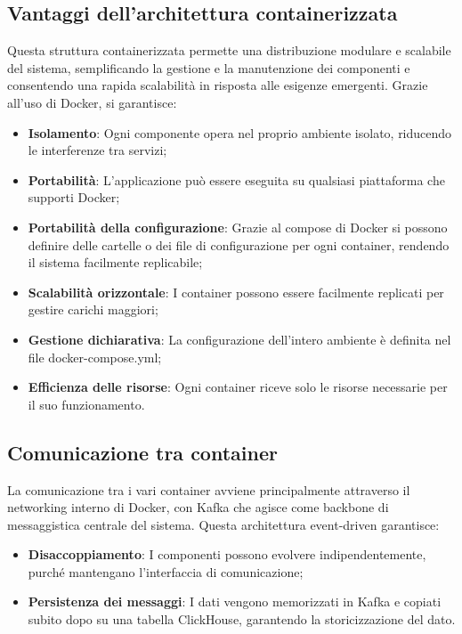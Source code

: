 \documentclass[10pt]{article}
\begin{document}
\subsection{Vantaggi dell'architettura containerizzata}
Questa struttura containerizzata permette una distribuzione modulare e scalabile del sistema, semplificando la gestione e la manutenzione dei componenti e consentendo una rapida scalabilità in risposta alle esigenze emergenti. Grazie all'uso di Docker, si garantisce:

\begin{itemize}
    \item \textbf{Isolamento}: Ogni componente opera nel proprio ambiente isolato, riducendo le interferenze tra servizi;
    \item \textbf{Portabilità}: L'applicazione può essere eseguita su qualsiasi piattaforma che supporti Docker;
    \item \textbf{Portabilità della configurazione}: Grazie al compose di Docker si possono definire delle cartelle o dei file di configurazione per ogni container, rendendo il sistema facilmente replicabile;
    \item \textbf{Scalabilità orizzontale}: I container possono essere facilmente replicati per gestire carichi maggiori;
    \item \textbf{Gestione dichiarativa}: La configurazione dell'intero ambiente è definita nel file docker-compose.yml;
    \item \textbf{Efficienza delle risorse}: Ogni container riceve solo le risorse necessarie per il suo funzionamento.
\end{itemize}

\subsection{Comunicazione tra container}
La comunicazione tra i vari container avviene principalmente attraverso il networking interno di Docker, con Kafka che agisce come backbone di messaggistica centrale del sistema. Questa architettura event-driven garantisce:

\begin{itemize}
    \item \textbf{Disaccoppiamento}: I componenti possono evolvere indipendentemente, purché mantengano l'interfaccia di comunicazione;
    \item \textbf{Persistenza dei messaggi}: I dati vengono memorizzati in Kafka e copiati subito dopo su una tabella ClickHouse, garantendo la storicizzazione del dato.
\end{itemize}
\end{document}
